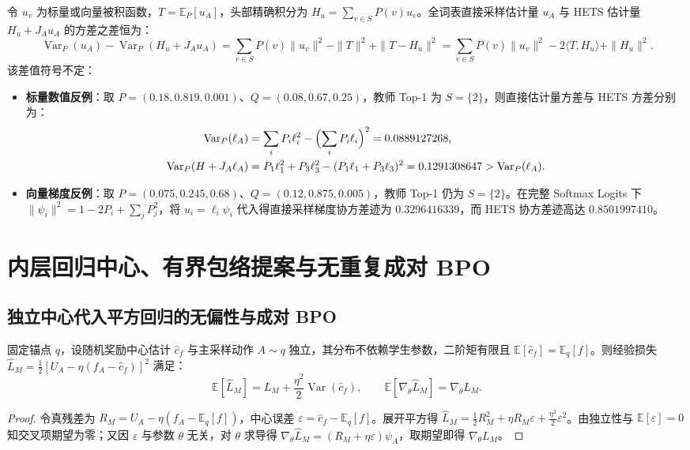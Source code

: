 \documentclass[lang=cn,scheme=chinese,openany]{elegantbook}
\newcommand{\E}{\mathbb E}
\newcommand{\Var}{\operatorname{Var}}
\begin{document}
令 $u_v$ 为标量或向量被积函数，$T=\E_P[u_A]$，头部精确积分为 $H_u=\sum_{v\in S}P(v)u_v$。全词表直接采样估计量 $u_A$ 与 HETS 估计量 $H_u+J_A u_A$ 的方差之差恒为：
\begin{equation}
\Var_P(u_A)-\Var_P(H_u+J_A u_A)
=\sum_{v\in S}P(v)\|u_v\|^2-\|T\|^2+\|T-H_u\|^2
=\sum_{v\in S}P(v)\|u_v\|^2-2\langle T,H_u\rangle+\|H_u\|^2.
\end{equation}
该差值符号不定：
\begin{itemize}
\item \textbf{标量数值反例}：取 $P=(0.18,0.819,0.001)$、$Q=(0.08,0.67,0.25)$，教师 Top-1 为 $S=\{2\}$，则直接估计量方差与 HETS 方差分别为：
\begin{align}
\Var_P(\ell_A)&=\sum_i P_i\ell_i^2-\Bigl(\sum_i P_i\ell_i\Bigr)^2=0.0889127268,\\
\Var_P(H+J_A\ell_A)&=P_1\ell_1^2+P_3\ell_3^2-(P_1\ell_1+P_3\ell_3)^2=0.1291308647>\Var_P(\ell_A).
\end{align}
\item \textbf{向量梯度反例}：取 $P=(0.075,0.245,0.68)$、$Q=(0.12,0.875,0.005)$，教师 Top-1 仍为 $S=\{2\}$。在完整 Softmax Logits 下 $\|\psi_i\|^2=1-2P_i+\sum_j P_j^2$，将 $u_i=\ell_i\psi_i$ 代入得直接采样梯度协方差迹为 $0.3296416339$，而 HETS 协方差迹高达 $0.8501997410$。
\end{itemize}

\section{内层回归中心、有界包络提案与无重复成对 BPO}
\label{est:inner}
\label{est:sec:kl-opd-roles}
\label{sec:power-estimators}
\label{sec:center-extensions}

\subsection{独立中心代入平方回归的无偏性与成对 BPO}

\begin{proposition}
\label{est:mean-center}
固定锚点 $q$，设随机奖励中心估计 $\widehat c_f$ 与主采样动作 $A\sim q$ 独立，其分布不依赖学生参数，二阶矩有限且 $\E[\widehat c_f]=\E_q[f]$。则经验损失 $\widehat L_M=\frac12[U_A-\eta(f_A-\widehat c_f)]^2$ 满足：
\begin{equation}
\E[\widehat L_M]=L_M+\frac{\eta^2}{2}\Var(\widehat c_f),\qquad
\E[\nabla_\theta\widehat L_M]=\nabla_\theta L_M.
\end{equation}
\end{proposition}
\begin{proof}
令真残差为 $R_M=U_A-\eta(f_A-\E_q[f])$，中心误差 $\varepsilon=\widehat c_f-\E_q[f]$。展开平方得 $\widehat L_M=\frac12 R_M^2+\eta R_M\varepsilon+\frac{\eta^2}{2}\varepsilon^2$。由独立性与 $\E[\varepsilon]=0$ 知交叉项期望为零；又因 $\varepsilon$ 与参数 $\theta$ 无关，对 $\theta$ 求导得 $\nabla_\theta\widehat L_M=(R_M+\eta\varepsilon)\psi_A$，取期望即得 $\nabla_\theta L_M$。
\end{proof}
\end{document}
